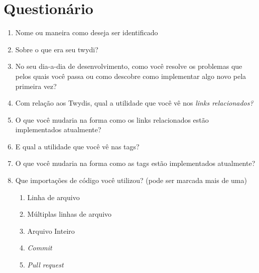 \apendice
\chapter{Questionário}

\begin{enumerate}
  \item \hspace{1pt} Nome ou maneira como deseja ser identificado

  \item \hspace{1pt} Sobre o que era seu twydi?

  \item \hspace{1pt} No seu dia-a-dia de desenvolvimento, como você resolve os problemas que pelos quais você passa ou como descobre como implementar algo novo pela primeira vez?

  \item \hspace{1pt} Com relação aos Twydis, qual a utilidade que você vê nos \textit{links relacionados?}

  \item \hspace{1pt} O que você mudaria na forma como os links relacionados estão implementados atualmente?

  \item \hspace{1pt} E qual a utilidade que você vê nas tags?

  \item \hspace{1pt} O que você mudaria na forma como as tags estão implementados atualmente?

  \item \hspace{1pt} Que importações de código você utilizou? (pode ser marcada mais de uma)
  \begin{enumerate}
    \item \hspace{1pt} Linha de arquivo
    \item \hspace{1pt} Múltiplas linhas de arquivo
    \item \hspace{1pt} Arquivo Inteiro
    \item \hspace{1pt} \textit{Commit}
    \item \hspace{1pt} \textit{Pull request}
  \end{enumerate}


\end{enumerate}
